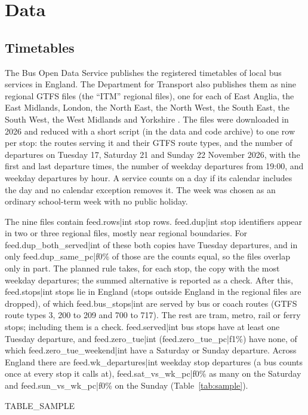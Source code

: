\documentclass[11pt,a4paper]{article}
\begin{document}
\section{Data}\label{sec:data}
\subsection{Timetables}
The Bus Open Data Service publishes the registered timetables of local bus services in England. The Department for Transport also publishes them as nine regional GTFS files (the ``ITM'' regional files), one for each of East Anglia, the East Midlands, London, the North East, the North West, the South East, the South West, the West Midlands and Yorkshire \citep{bods2026}. The files were downloaded in 2026 and reduced with a short script (in the data and code archive) to one row per stop: the routes serving it and their GTFS route types, and the number of departures on Tuesday 17, Saturday 21 and Sunday 22 November 2026, with the first and last departure times, the number of weekday departures from 19:00, and weekday departures by hour. A service counts on a day if its calendar includes the day and no calendar exception removes it. The week was chosen as an ordinary school-term week with no public holiday.

The nine files contain {{feed.rows|int}} stop rows. {{feed.dup|int}} stop identifiers appear in two or three regional files, mostly near regional boundaries. For {{feed.dup_both_served|int}} of these both copies have Tuesday departures, and in only {{feed.dup_same_pc|f0}}\% of those are the counts equal, so the files overlap only in part. The planned rule takes, for each stop, the copy with the most weekday departures; the summed alternative is reported as a check. After this, {{feed.stops|int}} stops lie in England (stops outside England in the regional files are dropped), of which {{feed.bus_stops|int}} are served by bus or coach routes (GTFS route types 3, 200 to 209 and 700 to 717). The rest are tram, metro, rail or ferry stops; including them is a check. {{feed.served|int}} bus stops have at least one Tuesday departure, and {{feed.zero_tue|int}} ({{feed.zero_tue_pc|f1}}\%) have none, of which {{feed.zero_tue_weekend|int}} have a Saturday or Sunday departure. Across England there are {{feed.wk_departures|int}} weekday stop departures (a bus counts once at every stop it calls at), {{feed.sat_vs_wk_pc|f0}}\% as many on the Saturday and {{feed.sun_vs_wk_pc|f0}}\% on the Sunday (Table~\ref{tab:sample}).

{{TABLE_SAMPLE}}
\end{document}
